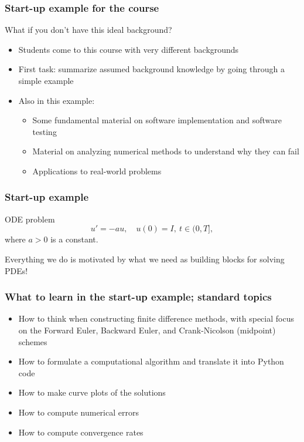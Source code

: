 \documentclass{beamer}
\begin{document}
\begin{frame}
\frametitle{Start-up example for the course}

What if you don't have this ideal background?

\begin{itemize}
 \item Students come to this course with very different backgrounds

 \item First task: summarize assumed background knowledge by going through
   a simple example

 \item Also in this example:
\begin{itemize}

   \item Some fundamental material on software implementation
     and software testing

   \item Material on analyzing numerical methods to understand
     why they can fail

   \item Applications to real-world problems
\end{itemize}

\noindent
\end{itemize}

\noindent
\end{frame}

\begin{frame}
\frametitle{Start-up example}

\begin{block}{ODE problem }
\[ u'=-au,\quad u(0)=I,\ t\in (0,T],\]
where $a>0$ is a constant.
\end{block}

Everything we do is motivated by what we need as building blocks for
solving PDEs!
\end{frame}

\begin{frame}
\frametitle{What to learn in the start-up example; standard topics}

\begin{itemize}
 \item How to think when constructing finite difference methods, with special focus
   on the Forward Euler, Backward Euler, and Crank-Nicolson (midpoint)
   schemes

 \item How to formulate a computational algorithm and translate it into
   Python code

 \item How to make curve plots of the solutions

 \item How to compute numerical errors

 \item How to compute convergence rates
\end{itemize}

\noindent
\end{frame}
\end{document}
